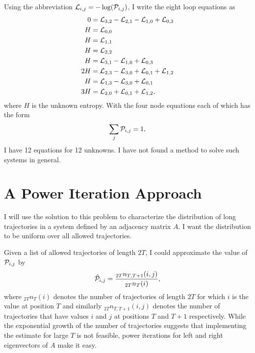 \documentclass[12pt]{article} \usepackage{amsmath,amsfonts}
\newcommand{\T}{{\cal P}}
\newcommand{\logprob}{{\cal L}}
\begin{document}
Using the abbreviation $\logprob_{i,j} = -\log(\T_{i,j})$, I write the eight
loop equations as
\begin{align*}
  0 &= \logprob_{3,2} - \logprob_{2,1} - \logprob_{1,0} + \logprob_{0,3} \\
  H &= \logprob_{0,0} \\
  H &= \logprob_{1,1} \\
  H &= \logprob_{2,2} \\
  H &= \logprob_{3,1} - \logprob_{1,0} + \logprob_{0,3} \\
  2H &= \logprob_{2,3} - \logprob_{3,0} + \logprob_{0,1} + \logprob_{1,2} \\
  H &= \logprob_{1,3} - \logprob_{3,0} + \logprob_{0,1} \\
  3H &= \logprob_{2,0} + \logprob_{0,1} + \logprob_{1,2},
\end{align*}
where $H$ is the unknown entropy.  With the four node equations
each of which has the form
\begin{equation*}
  \sum_j \T_{i,j} = 1,
\end{equation*}
I have 12 equations for 12 unknowns.  I have not found a method to
solve such systems in general.

\section{A Power Iteration Approach}
\label{sec:algorithm}

I will use the solution to this problem to characterize the
distribution of long trajectories in a system defined by an adjacency
matrix $A$.  I want the distribution to be uniform over all allowed
trajectories.

Given a list of allowed trajectories of length $2T$, I could
approximate the value of $\T_{i,j}$ by
\begin{equation*}
  \hat \T_{i,j} = \frac{_{2T}n_{T,T+1}(i,j)}{_{2T}n_{T}(i)},
\end{equation*}
where $_{2T}n_{T}(i)$ denotes the number of trajectories of length
$2T$ for which $i$ is the value at position $T$ and similarly
$_{2T}n_{T,T+1}(i,j)$ denotes the number of trajectories that have
values $i$ and $j$ at positions $T$ and $T+1$ respectively.  While the
exponential growth of the number of trajectories suggests that
implementing the estimate for large $T$ is not feasible, power
iterations for left and right eigenvectors of $A$ make it easy.
\end{document}
